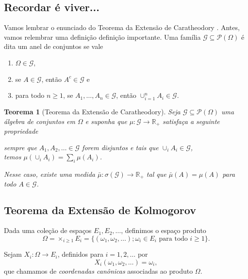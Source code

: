\documentclass[reqno, draft]{book}
\newcommand*\1{\mathds{1}}
\newtheorem{theorem}{Teorema}[section]
\begin{document}
\subsection{Recordar é viver...}

Vamos lembrar o enunciado do Teorema da Extensão de Caratheodory .
Antes, vamos relembrar uma definição definição importante.
Uma família $\mathcal{G} \subseteq \mathcal{P}(\Omega)$ é dita um anel de conjuntos  se vale
\begin{enumerate}[\quad a)]
  \item $\Omega \in \mathcal{G}$,
  \item se $A \in \mathcal{G}$, então $A^c \in \mathcal{G}$ e
  \item para todo $n \geq 1$, se $A_1, \dots, A_n \in \mathcal{G}$, então $\cup_{i=1}^n A_i \in \mathcal{G}$.
\end{enumerate}

\begin{theorem}[Teorema da Extensão de Caratheodory]
  Seja $\mathcal{G} \subseteq \mathcal{P}(\Omega)$ uma álgebra de conjuntos em $\Omega$ e suponha que $\mu: \mathcal{G} \to \mathbb{R}_+$ satisfaça a seguinte propriedade
  \begin{display}
    sempre que $A_1, A_2, \dots \in \mathcal{G}$ forem disjuntos e tais que $\cup_i A_i \in \mathcal{G}$,\\temos $\mu(\cup_i A_i) = \sum_i \mu(A_i)$.
  \end{display}
  Nesse caso, existe uma medida $\bar{\mu}: \sigma(\mathcal{G}) \to \mathbb{R}_+$ tal que $\bar{\mu}(A) = \mu(A)$ para todo $A \in \mathcal{G}$.
\end{theorem}


\subsection{Teorema da Extensão de Kolmogorov}

Dada uma coleção de espaços $E_1, E_2, \dots$, definimos o espaço produto
\begin{equation}
  \Omega = \times_{i\geq 1} E_i = \big\{(\omega_1, \omega_2, \dots); \omega_i \in E_i \text{ para todo $i \geq 1$}\big\}.
\end{equation}

Sejam $X_i:\Omega \to E_i$, definidos para $i = 1, 2, \dots$ por
\begin{equation}
  X_i(\omega_1, \omega_2, \dots) = \omega_i,
\end{equation}
que chamamos de \emph{coordenadas canônicas}  associadas ao produto $\Omega$.
\end{document}
